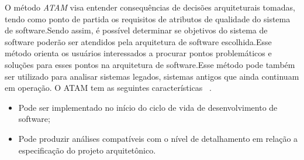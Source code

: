 O método \emph{\acrfull{ATAM}} visa entender  consequências de decisões arquiteturais tomadas, tendo como ponto de partida os requisitos de atributos de qualidade do sistema de software.Sendo assim, é possível determinar se objetivos do sistema de software poderão ser atendidos pela arquitetura de software escolhida.Esse método orienta os usuários interessados a procurar pontos problemáticos e soluções para esses pontos na arquitetura de software.Esse método pode também ser utilizado para analisar sistemas legados, sistemas antigos que ainda continuam em operação. O ATAM tem as seguintes características ~\cite{ATAM}. 

\begin{itemize}
    \item Pode ser implementado no início do ciclo de vida de desenvolvimento de software;
    \item Pode produzir análises compatíveis com o nível de detalhamento em relação a especificação do projeto arquitetônico.  
\end{itemize}

